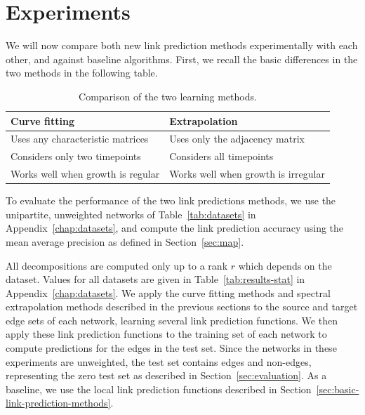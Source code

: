 \documentclass[11pt,a4paper]{book}
\newcommand{\syRank}{r}
\begin{document}
\section{Experiments}
\label{sec:learning-experiments}
We will now compare both new link prediction methods experimentally with
each other, and against baseline algorithms. First, we recall the basic
differences in the two methods in the following table.
\begin{table}[h]
  \centering
  \caption{Comparison of the two learning methods.}
  \begin{tabular}{p{} p{}}
    \toprule
    \textbf{Curve fitting} & \textbf{Extrapolation} \\
    \midrule
    Uses any characteristic matrices & Uses only the adjacency matrix \\
    Considers only two timepoints & Considers all timepoints \\
    Works well when growth is regular & Works well when growth is irregular
    \\ 
    \bottomrule
  \end{tabular}
  \label{tab:comparison-learning}
\end{table}

To evaluate the performance of the two link predictions methods, we use
the unipartite, unweighted networks of 
Table~\ref{tab:datasets} in Appendix~\ref{chap:datasets}, and compute
the link prediction accuracy  
using the mean average precision as defined in Section~\ref{sec:map}.  

All decompositions are computed only up to a rank $\syRank$ which depends on
the dataset.  Values for all datasets are given in
Table~\ref{tab:results-stat} in Appendix~\ref{chap:datasets}.  
We apply the curve fitting methods and spectral extrapolation methods
described in the previous sections to 
the source and target edge sets of each network, learning several link
prediction functions. 
We then apply these link prediction
functions to the training set of each network to compute predictions for
the edges in the test set. 
Since the networks in these experiments are unweighted, the test set
contains edges and non-edges, representing the zero test set as
described in Section~\ref{sec:evaluation}. 
As a baseline, we use the local link prediction functions described in 
Section~\ref{sec:basic-link-prediction-methods}.
\end{document}
